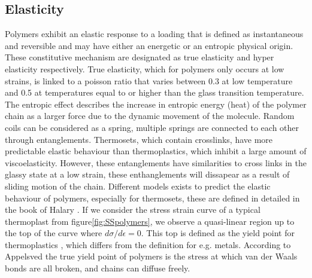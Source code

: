 \subsection{Elasticity}
Polymers exhibit an elastic response to a loading that is defined as instantaneous and reversible and may have either an energetic or an entropic physical origin. These constitutive mechanism are designated as true elasticity and hyper elasticity respectively. True elasticity, which for polymers only occurs at low strains, is linked to a poisson ratio that varies between 0.3 at low temperature and 0.5 at temperatures equal to or higher than the glass transition temperature. 
The entropic effect describes the increase in entropic energy (heat) of the polymer chain as a larger force due to the dynamic movement of the molecule. 
Random coils can be considered as a spring, multiple springs are connected to each other through entanglements. Thermosets, which contain crosslinks, have more predictable elastic behaviour than thermoplastics, which inhibit a large amount of viscoelasticity. However, these entanglements have similarities to cross links in the glassy state at a low strain, these enthanglements will dissapear as a result of sliding motion of the chain. Different models exists to predict the elastic behaviour of polymers, especially for thermosets, these are defined in detailed in the book of Halary \cite{Halary2011PolymerMaterials}. If we consider the stress strain curve of a typical thermoplast from figure\ref{fig:SSpolymers}, we observe a quasi-linear region up to the top of the curve where $d\sigma/d\epsilon=0$. This top is defined as the yield point for thermoplastics \cite{Afd2016NEN-EN-ISO527-2}, which differs from the definition for e.g. metals. According to Appelsved \cite{Appelsved2012InvestigationModels} the true yield point of polymers is the stress at which van der Waals bonds are all broken, and chains can diffuse freely.  

